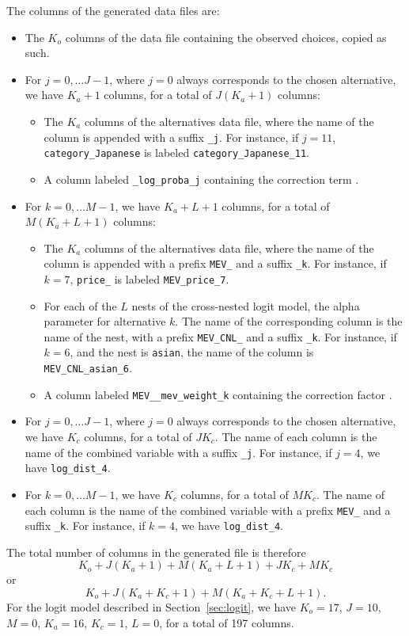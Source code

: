 \documentclass[12pt,a4paper]{article}
\begin{document}
The columns of the generated data files are:
\begin{itemize}
\item The $K_o$ columns of the data file containing the observed choices, copied as such.
\item For $j=0, \ldots J-1$, where $j=0$ always corresponds to the chosen alternative, we have $K_a+1$ columns, for a total of $J (K_a+1)$ columns: 
  \begin{itemize}
  \item The $K_a$ columns of the alternatives data file, where the name of the column is appended with a suffix \lstinline+_j+. For instance, if $j=11$, \lstinline+category_Japanese+ is labeled \lstinline+category_Japanese_11+.
  \item A column labeled \lstinline+_log_proba_j+ containing the correction term .
  \end{itemize}
\item For $k=0, \ldots M-1$, we have $K_a+L+1$ columns, for a total of $M (K_a+L+1)$ columns: 
  \begin{itemize}
  \item The $K_a$ columns of the alternatives data file, where the name of the column is appended with a prefix \lstinline+MEV_+ and a suffix \lstinline+_k+. For instance, if $k=7$, \lstinline+price_+ is labeled \lstinline+MEV_price_7+.
  \item For each of the $L$ nests of the cross-nested logit model, the alpha parameter for alternative $k$. The name of  the corresponding column is the name of the nest, with a prefix \lstinline+MEV_CNL_+ and a suffix \lstinline+_k+. For instance, if $k=6$, and the nest is \lstinline+asian+, the name of the column is \lstinline+MEV_CNL_asian_6+.
  \item A column labeled \lstinline+MEV__mev_weight_k+ containing the correction factor  .
\end{itemize}
\item  For $j=0, \ldots J-1$, where $j=0$ always corresponds to the chosen alternative, we have $K_c$ columns, for a total of $J K_c$. The name of each column is the name of the combined variable with a suffix \lstinline+_j+. For instance, if $j=4$, we have \lstinline+log_dist_4+.
\item  For $k=0, \ldots M-1$, we have $K_c$ columns, for a total of $M K_c$. The name of each column is the name of the combined variable with a prefix \lstinline+MEV_+ and a suffix \lstinline+_k+. For instance, if $k=4$, we have \lstinline+log_dist_4+.
\end{itemize}
The total number of columns in the generated file is therefore
 \[
K_o+J(K_a+1) + M(K_a+L+1) + JK_c + MK_c
\]
or
 \[
 K_o+J(K_a+K_c+1)  + M(K_a+K_c+L+1).
 \]
For the logit model described in Section~\ref{sec:logit}, we have
$K_o=17$, $J=10$, $M=0$, $K_a=16$, $K_c=1$, $L=0$, for a total of 197
columns.
\end{document}
